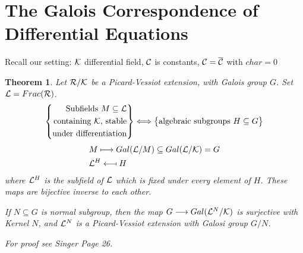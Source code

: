 \documentclass[11pt]{article}
\newtheorem{thm}{Theorem}[section]
\newcommand{\calc}{{\cal C}}
\newcommand{\calk}{{\cal K}}
\newcommand{\call}{{\cal L}}
\newcommand{\calr}{{\cal R}}
\newcommand{\lrta}{\longrightarrow}
\begin{document}
\section{The Galois Correspondence of Differential Equations}
Recall our setting: $\calk$ differential field, $\calc$ is constants, $\calc=\overline{\calc}$ with $char =0$
\begin{thm}
Let $\calr/\calk$ be a Picard-Vessiot extension, with Galois group $G$. Set $\call=Frac(\calr)$. 
$$
\left\{
\begin{aligned}
\text{Subfields $M\subseteq \call$}\\
\text{containing $\calk$, stable}\\
\text{under differentiation}
\end{aligned}
\right\}
\Longleftrightarrow
\left\{
\begin{aligned}
\text{algebraic subgroups  $H\subseteq G$}\\
\end{aligned}
\right\}
$$
$$
\begin{aligned}
&M\longmapsto Gal(\call/M)\subseteq Gal(\call/\calk)=G\\
&\call^H\longmapsfrom H
\end{aligned}
$$
where $\call^H$ is the subfield of $\call$ which is fixed under every element of $H$.
These maps are bijective inverse to each other.

If $N\subseteq G$ is normal subgroup, then the map $G\lrta Gal(\call^N/\calk)$ is surjective with Kernel $N$, and $\call^N$ is a Picard-Vessiot extension with Galosi group $G/N$.

For proof see Singer Page 26.
\end{thm}
\end{document}
